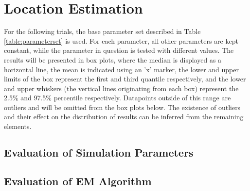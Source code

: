 \section{Location Estimation}
For the following trials, the base parameter set described in Table \ref{table:parameterset} is used. For each parameter, all other parameters are kept constant, while the parameter in question is tested with different values. The results will be presented in box plots, where the median is displayed as a horizontal line, the mean is indicated using an 'x' marker, the lower and upper limits of the box represent the first and third quantile respectively, and the lower and upper whiskers (the vertical lines originating from each box) represent the 2.5\% and 97.5\% percentile respectively. Datapoints outside of this range are outliers and will be omitted from the box plots below. The existence of outliers and their effect on the distribution of results can be inferred from the remaining elements.

\subsection{Evaluation of Simulation Parameters}

% 	

%
%
%
%
%
%
%

\subsection{Evaluation of EM Algorithm}
